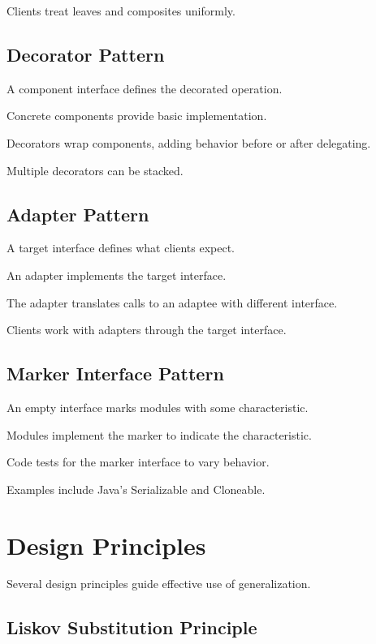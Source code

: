 \documentclass[11pt]{article}
\begin{document}
Clients treat leaves and composites uniformly.

\subsection{Decorator Pattern}

A component interface defines the decorated operation.

Concrete components provide basic implementation.

Decorators wrap components, adding behavior before or after delegating.

Multiple decorators can be stacked.

\subsection{Adapter Pattern}

A target interface defines what clients expect.

An adapter implements the target interface.

The adapter translates calls to an adaptee with different interface.

Clients work with adapters through the target interface.

\subsection{Marker Interface Pattern}

An empty interface marks modules with some characteristic.

Modules implement the marker to indicate the characteristic.

Code tests for the marker interface to vary behavior.

Examples include Java's Serializable and Cloneable.

\section{Design Principles}

Several design principles guide effective use of generalization.

\subsection{Liskov Substitution Principle}
\end{document}
